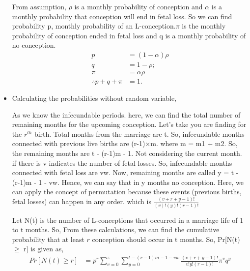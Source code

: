 \documentclass{article}
\begin{document}
\begin{itemize}
\begin{enumerate}
\end{enumerate}
\newpage
\begin{center}
\end{center}
\par From assumption, $\rho$ is a monthly probability of conception and $\alpha$ is a monthly probability that conception will end in fetal loss. So we can find probability p, monthly probability of an L-conception.$\pi$ is the monthly probability of conception ended in fetal loss and q is a monthly probability of no conception.
\begin{align*}
    p &= (1 - \alpha)\rho
    \\
    q &= 1 - \rho;
    \\
    \pi &= \alpha\rho
    \\
    \therefore p + q + \pi &= 1.
\end{align*}
\item Calculating the probabilities without random variable,
\par As we know the infecundable periods. here, we can find the total number of remaining months for the upcoming conception. Let's take you are finding for the $r^{th}$ birth. Total months from the marriage are t. So, infecundable months connected with previous live births are (r-1)$\times$m. where m = m1 + m2. So, the remaining months are t - (r-1)m - 1. Not considering the current month. if there is v indicates the number of fetal losses. So, infecundable months connected with fetal loss are vw. Now, remaining months are called y = t - (r-1)m - 1 - vw. Hence, we can say that in y months no conception. Here, we can apply the concept of permutation because these events (previous births, fetal losses) can happen in any order. which is $\frac{(v + r + y - 1)!}{(v)!(y)!(r-1)!}$\par
Let N(t) is the number of L-conceptions that occurred in a marriage life of 1 to t months. So, From these calculations, we can find the cumulative probability that at least $r$ conception should occur in t months. So, Pr[N(t)$\ge$ r] is given as,
\begin{align*}
    Pr[N(t)\ge r] &= p^r \sum_{v = 0}^{z} \sum_{y = 0}^{t - (r-1)m - 1 - vw} \frac{(v + r + y - 1)!}{v!y!(r-1)!} \pi^v q^y
\end{align*}


\end{itemize}
\end{document}
